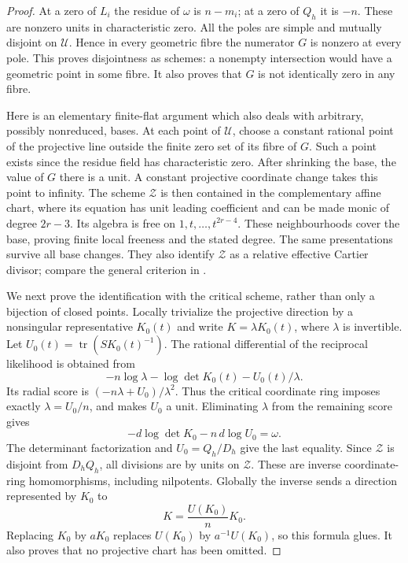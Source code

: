 \begin{proof}
At a zero of \(L_i\) the residue of \(\omega\) is \(n-m_i\);
at a zero of \(Q_h\) it is \(-n\).  These are nonzero units in
characteristic zero.  All the poles are simple and mutually disjoint
on \(\mathscr U\).  Hence in every geometric fibre the numerator
\(G\) is nonzero at every pole.  This proves disjointness as schemes:
a nonempty intersection would have a geometric point in some fibre.
It also proves that \(G\) is not identically zero in any fibre.

Here is an elementary finite-flat argument which also deals with
arbitrary, possibly nonreduced, bases.  At each point of
\(\mathscr U\), choose a constant rational point of the projective
line outside the finite zero set of its fibre of \(G\).  Such a
point exists since the residue field has characteristic zero.
After shrinking the base, the value of \(G\) there is a unit.
A constant projective coordinate change takes this point to infinity.
The scheme \(\mathscr Z\) is then contained in the complementary
affine chart, where its equation has unit leading coefficient and
can be made monic of degree \(2r-3\).  Its algebra is free on
\(1,t,\ldots,t^{2r-4}\).  These neighbourhoods cover the base,
proving finite local freeness and the stated degree.  The same
presentations survive all base changes.  They also identify
\(\mathscr Z\) as a relative effective Cartier divisor; compare
the general criterion in \cite[Tag~062Y]{StacksCritical144}.

We next prove the identification with the critical scheme, rather
than only a bijection of closed points.  Locally trivialize the
projective direction by a nonsingular representative \(K_0(t)\)
and write \(K=\lambda K_0(t)\), where \(\lambda\) is invertible.
Let \(U_0(t)=\operatorname{tr}(S K_0(t)^{-1})\).  The rational
differential of the reciprocal likelihood is obtained from
\[
 -n\log\lambda-\log\det K_0(t)-U_0(t)/\lambda.
\]
Its radial score is \((-n\lambda+U_0)/\lambda^2\).  Thus the
critical coordinate ring imposes exactly
\(\lambda=U_0/n\), and makes \(U_0\) a unit.  Eliminating
\(\lambda\) from the remaining score gives
\[
             -d\log\det K_0-n\,d\log U_0=\omega.
\]
The determinant factorization and \(U_0=Q_h/D_h\) give the
last equality.  Since \(\mathscr Z\) is disjoint from \(D_hQ_h\),
all divisions are by units on \(\mathscr Z\).  These are inverse
coordinate-ring homomorphisms, including nilpotents.  Globally the
inverse sends a direction represented by \(K_0\) to
\begin{equation}\label{eq:radial-reconstruction-v144}
                         K=\frac{U(K_0)}{n}K_0.
\end{equation}
Replacing \(K_0\) by \(aK_0\) replaces \(U(K_0)\) by
\(a^{-1}U(K_0)\), so this formula glues.  It also proves that no
projective chart has been omitted.


\end{proof}
